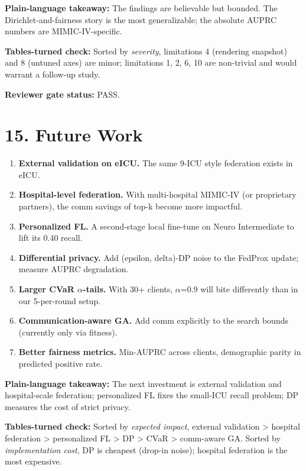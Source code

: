 \documentclass{article}
\begin{document}
\textbf{Plain-language takeaway:} The findings are believable but bounded. The Dirichlet-and-fairness story is the most generalizable; the absolute AUPRC numbers are MIMIC-IV-specific.


\textbf{Tables-turned check:} Sorted by \emph{severity}, limitations 4 (rendering snapshot) and 8 (untuned axes) are minor; limitations 1, 2, 6, 10 are non-trivial and would warrant a follow-up study.


\textbf{Reviewer gate status:} PASS.



\clearpage
\section{15. Future Work}


\begin{enumerate}[leftmargin=1.4em,itemsep=2pt,topsep=2pt]
  \item \textbf{External validation on eICU.} The same 9-ICU style federation exists in eICU.
  \item \textbf{Hospital-level federation.} With multi-hospital MIMIC-IV (or proprietary partners), the comm savings of top-k become more impactful.
  \item \textbf{Personalized FL.} A second-stage local fine-tune on Neuro Intermediate to lift its 0.40 recall.
  \item \textbf{Differential privacy.} Add (epsilon, delta)-DP noise to the FedProx update; measure AUPRC degradation.
  \item \textbf{Larger CVaR \ensuremath{\alpha}-tails.} With 30+ clients, \ensuremath{\alpha}=0.9 will bite differently than in our 5-per-round setup.
  \item \textbf{Communication-aware GA.} Add comm explicitly to the search bounds (currently only via fitness).
  \item \textbf{Better fairness metrics.} Min-AUPRC across clients, demographic parity in predicted positive rate.
\end{enumerate}


\textbf{Plain-language takeaway:} The next investment is external validation and hospital-scale federation; personalized FL fixes the small-ICU recall problem; DP measures the cost of strict privacy.


\textbf{Tables-turned check:} Sorted by \emph{expected impact}, external validation > hospital federation > personalized FL > DP > CVaR > comm-aware GA. Sorted by \emph{implementation cost}, DP is cheapest (drop-in noise); hospital federation is the most expensive.
\end{document}
